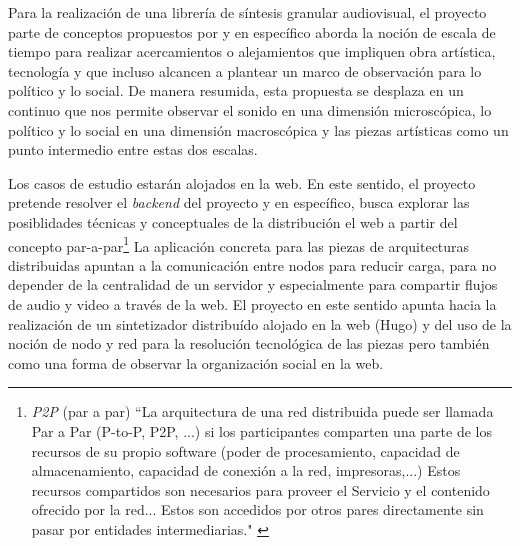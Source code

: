 Para la realización de una librería de síntesis granular audiovisual, el proyecto parte de conceptos propuestos por \cite{microsound} y en específico aborda la noción de escala de tiempo para realizar acercamientos o alejamientos que impliquen obra artística, tecnología y que incluso alcancen a plantear un marco de observación para lo político y lo social. De manera resumida, esta propuesta se desplaza en un continuo que nos permite observar el sonido en una dimensión microscópica, lo político y lo social en una dimensión macroscópica y las piezas artísticas como un punto intermedio entre estas dos escalas. 

Los casos de estudio estarán alojados en la web. En este sentido, el proyecto pretende resolver el \textit{backend} del proyecto y en específico, busca explorar las posiblidades técnicas y conceptuales de la distribución el web a partir del concepto par-a-par\footnote{\textit{P2P} (par a par) ``La arquitectura de una red distribuida puede ser llamada Par a Par (P-to-P, P2P, ...)   si los participantes comparten una parte de los recursos de su propio software (poder de procesamiento, capacidad de almacenamiento, capacidad de conexión a la red, impresoras,...) Estos recursos compartidos son necesarios para proveer el Servicio y el contenido ofrecido por la red... Estos son accedidos por otros pares directamente sin pasar por entidades intermediarias." \citep{p2p}} La aplicación concreta para las piezas de arquitecturas distribuidas apuntan a la comunicación entre nodos para reducir carga, para no depender de la centralidad de un servidor y especialmente para compartir flujos de audio y video a través de la web. El proyecto en este sentido apunta hacia la realización de un sintetizador distribuído alojado en la web (Hugo) y del uso de la noción de nodo y red para la resolución tecnológica de las piezas pero también como una forma de observar la organización social en la web. 

